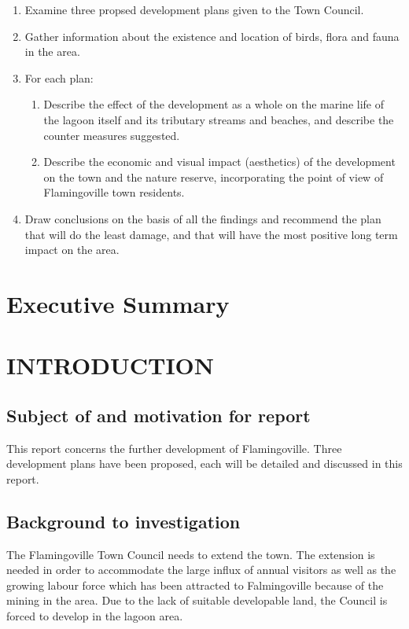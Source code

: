 \documentclass{article}
\begin{document}
\begin{enumerate}
	\item Examine three propsed development plans given to the Town Council.
	\item Gather information about the existence and location of birds, flora and fauna in the area.
	\item For each plan:
	\begin{enumerate}
		\item Describe the effect of the development as a whole on the marine life of the lagoon itself and its tributary streams and beaches, and describe the counter measures suggested.
		\item Describe the economic and visual impact (aesthetics) of the development on the town and the nature reserve, incorporating the point of view of Flamingoville town residents.
	\end{enumerate}
	\item Draw conclusions on the basis of all the findings and recommend the plan that will do the least damage, and that will have the most positive long term impact on the area.
\end{enumerate}

\newpage
\section*{Executive Summary}

\newpage
\tableofcontents

\setcounter{page}{0}

\newpage
\section{INTRODUCTION}
\subsection{Subject of and motivation for report}
This report concerns the further development of Flamingoville. Three development plans have been proposed, each will be detailed and discussed in this report.

\subsection{Background to investigation}
The Flamingoville Town Council needs to extend the town. The extension is needed in order to accommodate the large influx of annual visitors as well as the growing labour force which has been attracted to Falmingoville because of the mining in the area. Due to the lack of suitable developable land, the Council is forced to develop in the lagoon area.
\end{document}
